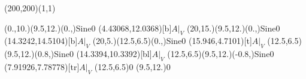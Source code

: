 \unitlength=1bp%

\begin{feynartspicture}(200,200)(1,1)

\FADiagram{}
\FAProp(0.,10.)(9.5,12.)(0.,){Sine}{0}
\FALabel(4.43068,12.0368)[b]{$A|_V$}
\FAProp(20,15.)(9.5,12.)(0.,){Sine}{0}
\FALabel(14.3242,14.5104)[b]{$A|_V$}
\FAProp(20,5.)(12.5,6.5)(0.,){Sine}{0}
\FALabel(15.946,4.7101)[t]{$A|_V$}
\FAProp(12.5,6.5)(9.5,12.)(0.8,){Sine}{0}
\FALabel(14.3394,10.3392)[bl]{$A|_V$}
\FAProp(12.5,6.5)(9.5,12.)(-0.8,){Sine}{0}
\FALabel(7.91926,7.78778)[tr]{$A|_V$}
\FAVert(12.5,6.5){0}
\FAVert(9.5,12.){0}
\end{feynartspicture}

